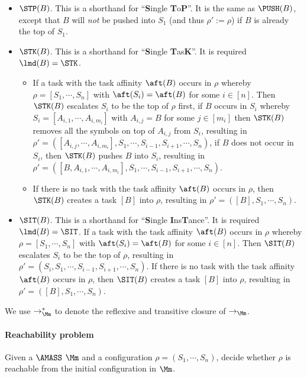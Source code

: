 \begin{itemize}
\begin{itemize}
  	\item $\STP(B)$. This is a shorthand for ``\textbf{S}ingle \textbf{T}o\textbf{P}''. It is the same as $\PUSH(B)$, except that $B$ will \emph{not} be pushed into $S_1$ (and thus $\rho':=\rho$) if $B$ is already the top of $S_1$. 
  	\item $\STK(B)$. This is a shorthand for ``\textbf{S}ingle \textbf{T}as\textbf{K}''. It is required $\lmd(B)=\STK$.
        \begin{itemize}
            \item If a task with the task affinity $\aft(B)$ occurs in $\rho$ whereby $\rho=[S_1,\cdots,S_n]$ with $\aft(S_i) = \aft(B)$ for some $i\in[n]$. Then $\STK(B)$ escalates $S_i$ to be the top of $\rho$ first, if $B$ occurs in $S_i$ whereby $S_i = [A_{i,1},\cdots,A_{i,m_i}]$ with $A_{i,j} = B$ for some $j\in[m_i]$ then $\STK(B)$ removes all the symbols on top of $A_{i,j}$ from $S_i$, resulting in $\rho'=([A_{i,j},\cdots,A_{i,m_i}],S_1,\cdots,S_{i-1},S_{i+1},\cdots,S_{n})$, if $B$ does not occur in $S_i$, then $\STK(B)$ pushes $B$ into $S_i$, resulting in $\rho'=([B,A_{i,1},\cdots,A_{i,m_i}],S_1,\cdots,S_{i-1},S_{i+1},\cdots,S_n)$.
            \item If there is no task with the task affinity $\aft(B)$ occurs in $\rho$, then $\STK(B)$ creates a task $[B]$ into $\rho$, resulting in $\rho' = ([B],S_1,\cdots,S_n)$.
        \end{itemize}
    \item $\SIT(B)$. This is a shorthand for ``\textbf{S}ingle \textbf{I}ns\textbf{T}ance''. It is required $\lmd(B)=\SIT$. If a task with the task affinity $\aft(B)$ occurs in $\rho$ whereby $\rho=[S_1,\cdots,S_n]$ with $\aft(S_i) = \aft(B)$ for some $i\in[n]$. Then $\SIT(B)$ escalates $S_i$ to be the top of $\rho$, resulting in $\rho'=(S_i,S_1,\cdots,S_{i-1},S_{i+1},\cdots,S_n)$. If there is no task with the task affinity $\aft(B)$ occurs in $\rho$, then $\SIT(B)$ creates a task $[B]$ into $\rho$, resulting in $\rho' = ([B],S_1,\cdots,S_n)$.

\end{itemize}
\end{itemize}
We use $\rightarrow_\Mm^*$ to denote the reflexive and transitive closure of $\rightarrow_\Mm$.


\paragraph{Reachability problem} Given a $\AMASS$ $\Mm$ and a 
configuration $\rho = (S_1, \cdots, S_n)$, decide whether $\rho$ is reachable from the initial configuration in $\Mm$.


